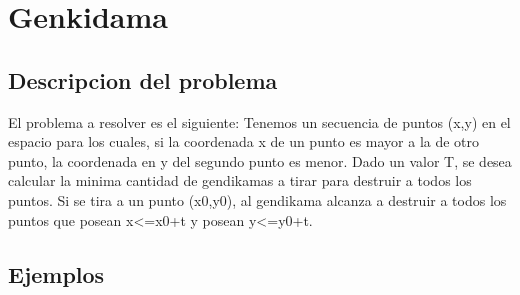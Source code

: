 \documentclass[10pt,a4paper]{article}
\begin{document}

\section{Genkidama}

\subsection{Descripcion del problema}

El problema a resolver es el siguiente:
Tenemos un secuencia de puntos (x,y) en el espacio para los cuales, si la coordenada x de un punto es mayor a la de otro punto, la coordenada en y del segundo punto es menor. Dado un valor T, se desea calcular la minima cantidad de gendikamas a tirar para destruir a todos los puntos. Si se tira a un punto (x0,y0), al gendikama alcanza a destruir a todos los puntos que posean x<=x0+t y posean y<=y0+t.\\

\subsection{Ejemplos}
\end{document}
